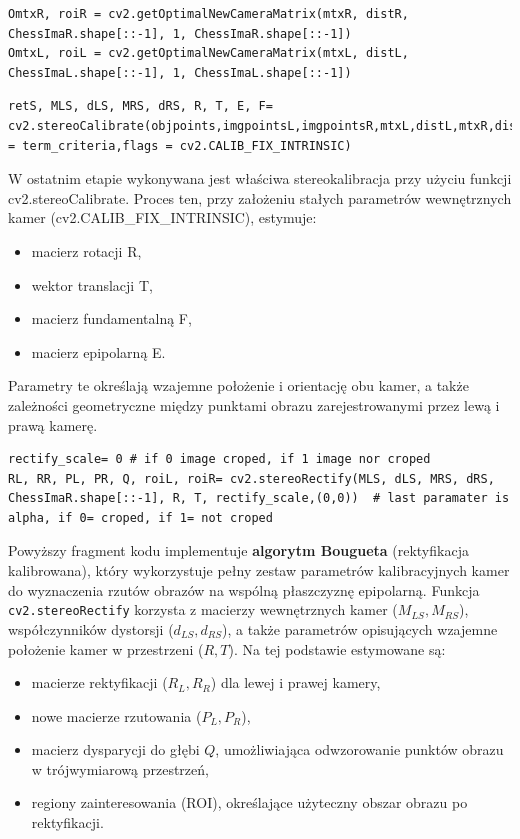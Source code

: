 \documentclass[magisterska]{pracadypl}
\begin{document}
\begin{lstlisting}[style=mypython]
OmtxR, roiR = cv2.getOptimalNewCameraMatrix(mtxR, distR, ChessImaR.shape[::-1], 1, ChessImaR.shape[::-1])
OmtxL, roiL = cv2.getOptimalNewCameraMatrix(mtxL, distL, ChessImaL.shape[::-1], 1, ChessImaL.shape[::-1])
\end{lstlisting}

\begin{lstlisting}[style=mypython]
retS, MLS, dLS, MRS, dRS, R, T, E, F= cv2.stereoCalibrate(objpoints,imgpointsL,imgpointsR,mtxL,distL,mtxR,distR,ChessImaR.shape[::-1],criteria = term_criteria,flags = cv2.CALIB_FIX_INTRINSIC)
\end{lstlisting}

W ostatnim etapie wykonywana jest właściwa stereokalibracja przy użyciu funkcji cv2.stereoCalibrate.
Proces ten, przy założeniu stałych parametrów wewnętrznych kamer (cv2.CALIB\_FIX\_INTRINSIC), estymuje:

\begin{itemize}
    \item macierz rotacji R,
    \item wektor translacji T,
    \item macierz fundamentalną F,
    \item macierz epipolarną E.
\end{itemize}

Parametry te określają wzajemne położenie i orientację obu kamer, a także zależności geometryczne między punktami obrazu zarejestrowanymi przez lewą i prawą kamerę.

\begin{lstlisting}[style=mypython]
rectify_scale= 0 # if 0 image croped, if 1 image nor croped
RL, RR, PL, PR, Q, roiL, roiR= cv2.stereoRectify(MLS, dLS, MRS, dRS, ChessImaR.shape[::-1], R, T, rectify_scale,(0,0))  # last paramater is alpha, if 0= croped, if 1= not croped
\end{lstlisting}

Powyższy fragment kodu implementuje \textbf{algorytm Bougueta} (rektyfikacja kalibrowana), który wykorzystuje pełny zestaw parametrów kalibracyjnych kamer do wyznaczenia rzutów obrazów na wspólną płaszczyznę epipolarną. 
Funkcja \texttt{cv2.stereoRectify} korzysta z macierzy wewnętrznych kamer ($M_{LS}, M_{RS}$), współczynników dystorsji ($d_{LS}, d_{RS}$), a także parametrów opisujących wzajemne położenie kamer w przestrzeni ($R,T$). 
Na tej podstawie estymowane są:

\begin{itemize}
    \item macierze rektyfikacji ($R_L,R_R$) dla lewej i prawej kamery,
    \item nowe macierze rzutowania ($P_L,P_R$),
    \item macierz dysparycji do głębi $Q$, umożliwiająca odwzorowanie punktów obrazu w trójwymiarową przestrzeń,
    \item regiony zainteresowania (ROI), określające użyteczny obszar obrazu po rektyfikacji.
\end{itemize}
\end{document}
